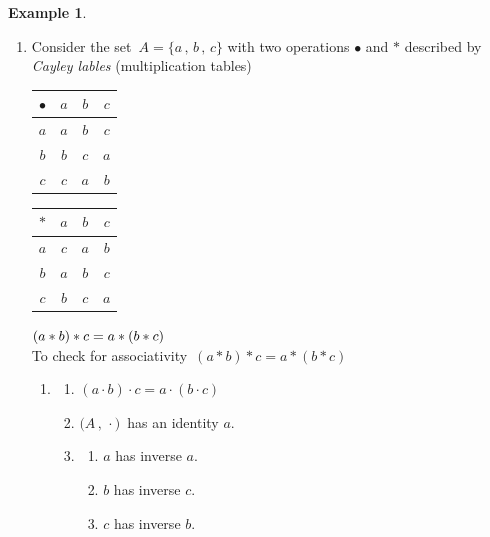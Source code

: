 \documentclass[11pt,a4paper]{article}
\theoremstyle{definition}
\newtheorem{exa}[thm]{Example}
\begin{document}
\begin{exa}
\begin{enumerate}
\begin{enumerate}
      \item[(ii)] $\exists\, 1/1 = 1 \in \mathbb{Q}^+ \, \ni\, \dfrac{a}{b}\times 1 = 1 \times \dfrac{a}{b} = \dfrac{a}{b}$\\
      
      
      \item[(iii)] $\forall\, \dfrac{a}{b}\,\in \mathbb{Q}^+\, , \, \dfrac{a}{b}\times \dfrac{b}{a} = \dfrac{b}{a}\times \dfrac{a}{b} = 1$\\\\
\end{enumerate}


\item Consider the set $\, A = \{a\, , \, b\, , \, c\}$ with two operations $\bullet$ and $*$ described by \textit{Cayley lables} (multiplication tables)
\begin{table}[H]
\centering
\begin{tabular}{c|c|c|c|}
$\bullet$ & $a$ & $b$ & $c$\\
\hline
$a$ & $a$ & $b$ & $c$\\
\hline
$b$ & $b$ & $c$ & $a$\\
\hline
$c$ & $c$ & $a$ & $b$\\
\hline
\end{tabular}
\hspace{2cm}
\begin{tabular}{c|c|c|c|}
$*$ & $a$ & $b$ & $c$\\
\hline
$a$ & $c$ & $a$ & $b$\\
\hline
$b$ & $a$ & $b$ & $c$\\
\hline
$c$ & $b$ & $c$ & $a$\\
\hline
\end{tabular}
\end{table}



$(a*b)*c = a*(b*c)\hspace{0.4cm}$\\ To check for  associativity $\, (a*b)*c = a*(b*c)$

\begin{enumerate}
    \item \begin{enumerate}
           \item[(i)] $(a\cdot b)\cdot c = a\cdot (b\cdot c)$
           \item[(ii)] $\big(A\, , \, \cdot\big)\,$ has an identity $a$.
           \item[(iii)]\begin{enumerate}
                        \item[] $a$ has inverse $a$.
                        \item[] $b$ has inverse $c$.
                        \item[] $c$ has inverse $b$.\\
           \end{enumerate}
    \end{enumerate}
    

\end{enumerate}
\end{enumerate}
\end{exa}
\end{document}
